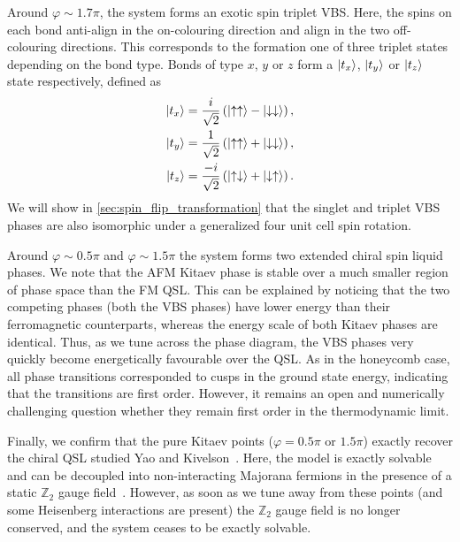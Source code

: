 Around $\varphi \sim 1.7\pi$, the system forms an exotic spin triplet VBS. Here, the spins on each bond anti-align in the on-colouring direction and align in the two off-colouring directions. This corresponds to the formation one of three triplet states depending on the bond type. Bonds of type $x$, $y$ or $z$ form a $\ket{t_x}$, $\ket{t_y}$ or $\ket{t_z}$ state respectively, defined as
\begin{align}
    \ket{t_x} = \frac{i}{\sqrt 2} \left ( \ket{\uparrow \uparrow}-\ket{\downarrow \downarrow} \right ), \label{eqn:tx_def} \\
    \ket{t_y} = \frac{1}{\sqrt 2} \left ( \ket{\uparrow \uparrow}+\ket{\downarrow \downarrow} \right ),\label{eqn:ty_def} \\
    \ket{t_z} =  \frac{-i}{\sqrt 2} \left ( \ket{\uparrow \downarrow}+\ket{\downarrow \uparrow} \right ).\label{eqn:tz_def}
\end{align}
We will show in \textsection\ref{sec:spin_flip_transformation} that the singlet and triplet VBS phases are also isomorphic under a generalized four unit cell spin rotation.

Around $\varphi \sim 0.5\pi$ and $\varphi \sim 1.5\pi$ the system forms two extended chiral spin liquid phases. We note that the AFM Kitaev phase is stable over a much smaller region of phase space than the FM QSL. This can be explained by noticing that the two competing phases (both the VBS phases) have lower energy than their ferromagnetic counterparts, whereas the energy scale of both Kitaev phases are identical. Thus, as we tune across the phase diagram, the VBS phases very quickly become energetically favourable over the QSL. As in the honeycomb case, all phase transitions corresponded to cusps in the ground state energy, indicating that the transitions are first order. However, it remains an open and numerically challenging question whether they remain first order in the thermodynamic limit. 

Finally, we confirm that the pure Kitaev points ($\varphi = 0.5\pi$ or $1.5\pi$) exactly recover the chiral QSL studied Yao and Kivelson~\cite{yao_exact_2007}. Here, the model is exactly solvable and can be decoupled into non-interacting Majorana fermions in the presence of a static $\mathbb Z_2$ gauge field~\cite{kitaev_anyons_2006}. However, as soon as we tune away from these points (and some Heisenberg interactions are present) the $\mathbb Z_2$ gauge field is no longer conserved, and the system ceases to be exactly solvable. 

